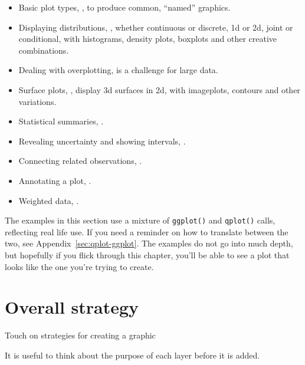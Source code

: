 \begin{itemize}
  \item Basic plot types, , to produce common, ``named'' graphics.
  
  \item Displaying distributions, , whether continuous or discrete, 1d or 2d, joint or conditional, with histograms, density plots, boxplots and other creative combinations.
  
  \item Dealing with overplotting,  is a challenge for large data.

  \item Surface plots, , display 3d surfaces in 2d, with imageplots, contours and other variations.

  \item Statistical summaries, .

  \item Revealing uncertainty and showing intervals, .

  \item Connecting related observations, .

  \item Annotating a plot, .

  \item Weighted data, .
  
\end{itemize}

The examples in this section use a mixture of {\tt ggplot()} and {\tt qplot()} calls, reflecting real life use.  If you need a reminder on how to translate between the two, see Appendix~\ref{sec:qplot-ggplot}.  The examples do not go into much depth, but hopefully if you flick through this chapter, you'll be able to see a plot that looks like the one you're trying to create.

\section{Overall strategy}
\label{sec:strategy}

Touch on strategies for creating a graphic

It is useful to think about the purpose of each layer before it is added.  

